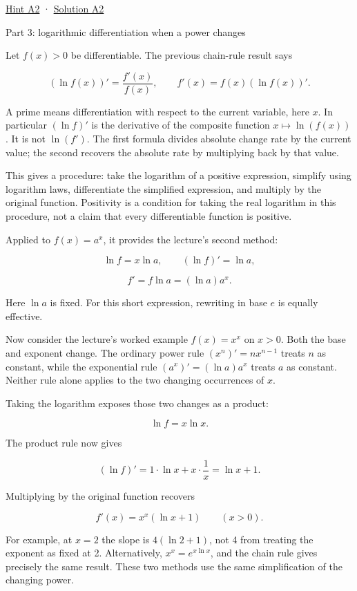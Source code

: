 \documentclass[
  11pt,
]{article}
\begin{document}
\protect\hyperlink{hint-a2}{Hint A2} ·
\protect\hyperlink{solution-a2}{Solution A2}

Part 3: logarithmic differentiation when a power changes

Let \(f(x)>0\) be differentiable. The previous chain-rule result says

\[
(\ln f(x))'=\frac{f'(x)}{f(x)},\qquad
f'(x)=f(x)(\ln f(x))'.
\]

A prime means differentiation with respect to the current variable, here
\(x\). In particular \((\ln f)'\) is the derivative of the composite
function \(x\mapsto\ln(f(x))\). It is not \(\ln(f')\). The first formula
divides absolute change rate by the current value; the second recovers
the absolute rate by multiplying back by that value.

This gives a procedure: take the logarithm of a positive expression,
simplify using logarithm laws, differentiate the simplified expression,
and multiply by the original function. Positivity is a condition for
taking the real logarithm in this procedure, not a claim that every
differentiable function is positive.

Applied to \(f(x)=a^x\), it provides the lecture's second method:

\[
\ln f=x\ln a,\qquad (\ln f)'=\ln a,
\]

\[
f'=f\ln a=(\ln a)a^x.
\]

Here \(\ln a\) is fixed. For this short expression, rewriting in base
\(e\) is equally effective.

Now consider the lecture's worked example \(f(x)=x^x\) on \(x>0\). Both
the base and exponent change. The ordinary power rule
\((x^n)'=nx^{n-1}\) treats \(n\) as constant, while the exponential rule
\((a^x)'=(\ln a)a^x\) treats \(a\) as constant. Neither rule alone
applies to the two changing occurrences of \(x\).

Taking the logarithm exposes those two changes as a product:

\[
\ln f=x\ln x.
\]

The product rule now gives

\[
(\ln f)'=1\cdot\ln x+x\cdot\frac1x=\ln x+1.
\]

Multiplying by the original function recovers

\[
f'(x)=x^x(\ln x+1)\qquad(x>0).
\]

For example, at \(x=2\) the slope is \(4(\ln2+1)\), not 4 from treating
the exponent as fixed at 2. Alternatively, \(x^x=e^{x\ln x}\), and the
chain rule gives precisely the same result. These two methods use the
same simplification of the changing power.
\end{document}
